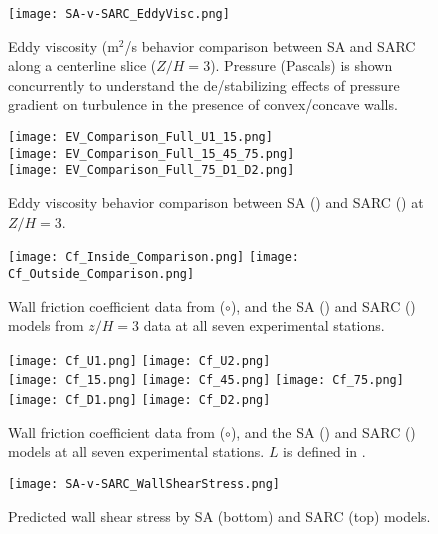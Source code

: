 \documentclass[11pt]{article}
\begin{document}
\begin{figure}[h!]
\centering
\texttt{[image: SA-v-SARC\_EddyVisc.png]}
\caption{Eddy viscosity (m$^2$/s behavior comparison between SA and SARC along a centerline slice ($Z/H=3$). Pressure (Pascals) is shown concurrently to understand the de/stabilizing effects of pressure gradient on turbulence in the presence of convex/concave walls.}
\label{fig:ev_slices}
\end{figure}

\begin{figure}[h!]
\centering
\texttt{[image: EV\_Comparison\_Full\_U1\_15.png]}\\
\texttt{[image: EV\_Comparison\_Full\_15\_45\_75.png]}\\
\texttt{[image: EV\_Comparison\_Full\_75\_D1\_D2.png]}
\caption{Eddy viscosity behavior comparison between SA (\solidrule[6mm]) and SARC (\dashrule) at $Z/H=3$.}
\label{fig:ev_lines}
\end{figure}

\begin{figure}[h!]
\centering
\texttt{[image: Cf\_Inside\_Comparison.png]}
\texttt{[image: Cf\_Outside\_Comparison.png]}
\caption{Wall friction coefficient data from \citet{kim1994} ($\circ$), and the SA ({\color{blue}\solidrule[6mm]}) and SARC ({\color{red}\dashrule}) models from $z/H=3$ data at all seven experimental stations.}
\label{fig:Cf_Centerlines}
\end{figure}

\begin{figure}[h!]
\centering
\texttt{[image: Cf\_U1.png]}
\texttt{[image: Cf\_U2.png]}\\
\texttt{[image: Cf\_15.png]}
\texttt{[image: Cf\_45.png]}
\texttt{[image: Cf\_75.png]}\\
\texttt{[image: Cf\_D1.png]}
\texttt{[image: Cf\_D2.png]}
\caption{Wall friction coefficient data from \citet{kim1994} ($\circ$), and the SA ({\color{blue}\solidrule[6mm]}) and SARC ({\color{red}\dashrule}) models at all seven experimental stations. $L$ is defined in .}
\label{fig:Cf_slices}
\end{figure}

\begin{figure}[h!]
\centering
\texttt{[image: SA-v-SARC\_WallShearStress.png]}
\caption{Predicted wall shear stress by SA (bottom) and SARC (top) models.}
\label{fig:wss}
\end{figure}
\end{document}
